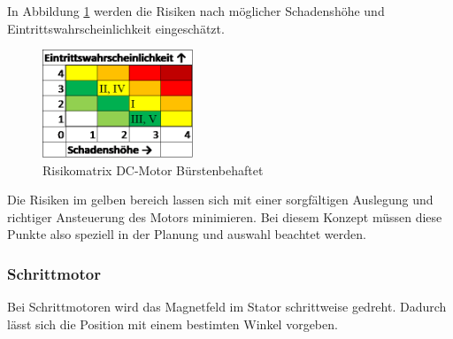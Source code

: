 \documentclass[../../../main.tex]{subfiles}
\begin{document}
    In Abbildung \ref{fig:antr_risikomatrix_buerstenbehaftet} werden die Risiken nach möglicher Schadenshöhe und Eintrittswahrscheinlichkeit eingeschätzt.

    \begin{figure}[H]
        \centering
        \includegraphics[width=0.4\textwidth]{Antr_Risiko_DCMotor_Buerstenbehaftet.png}
        \caption {Risikomatrix DC-Motor Bürstenbehaftet}
        \label{fig:antr_risikomatrix_buerstenbehaftet}
    \end{figure}

    Die Risiken im gelben bereich lassen sich mit einer sorgfältigen Auslegung und richtiger Ansteuerung des Motors minimieren. Bei diesem Konzept müssen diese Punkte also speziell in der Planung und auswahl beachtet werden. 

    \subsubsection{Schrittmotor}
    Bei Schrittmotoren wird das Magnetfeld im Stator schrittweise gedreht. Dadurch lässt sich die Position mit einem bestimten Winkel vorgeben.
\end{document}
